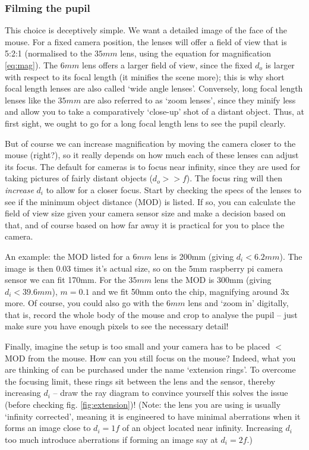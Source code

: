 \documentclass[a4paper]{report}
\begin{document}
	
	\subsubsection{Filming the pupil}
	This choice is deceptively simple. We want a detailed image of the face of the mouse. For a fixed camera position, the lenses will offer a field of view that is 5:2:1 (normalised to the $35mm$ lens, using the equation for magnification \ref{eq:mag}). The $6mm$ lens offers a larger field of view, since the fixed $d_o$ is larger with respect to its focal length (it minifies the scene more); this is why short focal length lenses are also called `wide angle lenses'. Conversely, long focal length lenses like the $35mm$ are also referred to as `zoom lenses', since they minify less and allow you to take a comparatively `close-up' shot of a distant object. Thus, at first sight, we ought to go for a long focal length lens to see the pupil clearly.
	
	
	But of course we can increase magnification by moving the camera closer to the mouse (right?), so it really depends on how much each of these lenses can adjust its focus. The default for cameras is to focus near infinity, since they are used for taking pictures of fairly distant objects ($d_o>>f$). The focus ring will then \emph{increase} $d_i$ to allow for a closer focus. Start by checking the specs of the lenses to see if the minimum object distance (MOD) is listed. If so, you can calculate the field of view size given your camera sensor size and make a decision based on that, and of course based on how far away it is practical for you to place the camera. 
	
	
	An example: the MOD listed for a $6mm$ lens is 200mm (giving $d_i<6.2mm$). The image is then 0.03 times it's actual size, so on the 5mm raspberry pi camera sensor we can fit 170mm. For the $35mm$ lens the MOD is 300mm (giving $d_i<39.6mm$), $m=0.1$ and we fit 50mm onto the chip, magnifying around 3x more. Of course, you could also go with the $6mm$ lens and `zoom in' digitally, that is, record the whole body of the mouse and crop to analyse the pupil -- just make sure you have enough pixels to see the necessary detail!
	

	Finally, imagine the setup is too small and your camera has to be placed $<$MOD from the mouse. How can you still focus on the mouse? Indeed, what you are thinking of can be purchased under the name `extension rings'. To overcome the focusing limit, these rings sit between the lens and the sensor, thereby increasing $d_i$ -- draw the ray diagram to convince yourself this solves the issue (before checking fig. \ref{fig:extension})! (Note: the lens you are using is usually `infinity corrected', meaning it is engineered to have minimal aberrations when it forms an image close to $d_i=1f$ of an object located near infinity. Increasing $d_i$ too much introduce aberrations if forming an image say at $d_i=2f$.)
	
\end{document}
